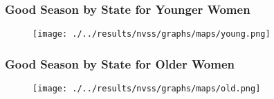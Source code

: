 \documentclass[10pt,letterpaper,subeqn]{beamer}
\begin{document}
\begin{frame}
  \frametitle{Good Season by State for Younger Women}
  \begin{figure}[htpb!]
    \begin{center}
      \centering
      \texttt{[image: ./../results/nvss/graphs/maps/young.png]}
      \label{fig:mapYoung}
    \end{center}
  \end{figure}
\end{frame}

\begin{frame}
  \frametitle{Good Season by State for Older Women}
  \begin{figure}[htpb!]
    \begin{center}
      \centering
      \texttt{[image: ./../results/nvss/graphs/maps/old.png]}
      \label{fig:mapOld}
    \end{center}
  \end{figure}
\end{frame}
\end{document}
